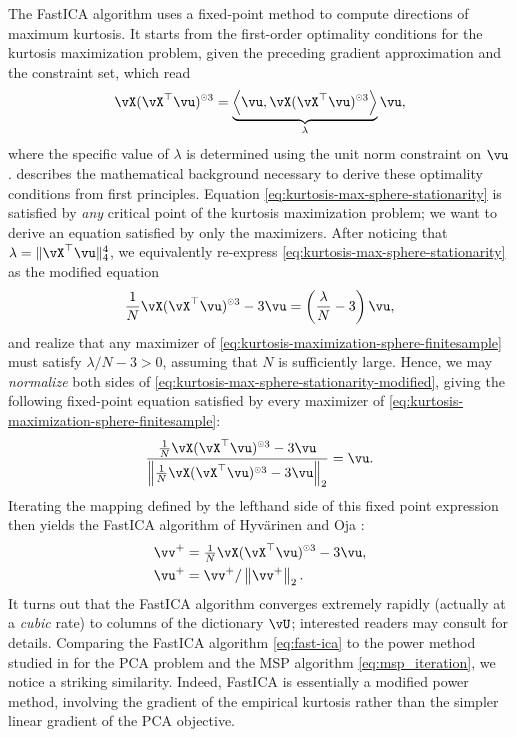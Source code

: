 \documentclass[../../book-main.tex]{subfiles}
\begin{document}
The FastICA algorithm uses a fixed-point method to compute directions of maximum kurtosis. It starts from the first-order optimality conditions for the kurtosis maximization problem, given the preceding gradient approximation and the constraint set, which read
\begin{align}\label{eq:kurtosis-max-sphere-stationarity}
   \vX (\vX^\top \vu)^{\hada 3} 
   = 
   \underbrace{
   \ip*{\vu}{
   \vX (\vX^\top \vu)^{\hada 3} 
   }}_{\lambda} \vu,
\end{align}
where the specific value of $\lambda$ is determined using the unit norm constraint on $\vu$.
 describes the mathematical background necessary to derive these optimality conditions from first principles.
Equation \eqref{eq:kurtosis-max-sphere-stationarity} is satisfied by \textit{any} critical point of the kurtosis maximization problem; we want to derive an equation satisfied by only the maximizers.
After noticing that $\lambda = \norm{\vX^\top \vu}_4^4$, we equivalently re-express \eqref{eq:kurtosis-max-sphere-stationarity} as the modified equation
\begin{align}\label{eq:kurtosis-max-sphere-stationarity-modified}
   \frac{1}{N}\vX (\vX^\top \vu)^{\hada 3} 
   - 
   3 \vu
   = 
   \left(
   \frac{\lambda}{N} - 3
   \right)
   \vu,
\end{align}
and realize that any maximizer of \eqref{eq:kurtosis-maximization-sphere-finitesample} 
must satisfy $\lambda / N - 3 > 0$,
assuming that $N$ is sufficiently large.
Hence, we may \textit{normalize} both sides of \eqref{eq:kurtosis-max-sphere-stationarity-modified},
giving the following fixed-point equation satisfied by every maximizer of \eqref{eq:kurtosis-maximization-sphere-finitesample}:
\begin{align}\label{eq:kurtosis-max-sphere-fxp}
\frac{
   \frac{1}{N}\vX (\vX^\top \vu)^{\hada 3} 
   - 
   3 \vu
   }{
   \norm*{
   \frac{1}{N}\vX (\vX^\top \vu)^{\hada 3} 
   - 
   3 \vu
   }_2
   }
   =
   \vu.
\end{align}
Iterating the mapping defined by the lefthand side of this fixed point expression then yields the FastICA algorithm of Hyv\"{a}rinen and Oja \cite{hyvarinen-1997}:
\begin{equation}
\begin{split}\label{eq:fast-ica}
   \vv^+ &= \tfrac{1}{N}\vX (\vX^\top \vu)^{\hada 3}- 3 \vu
   ,  \\
   \vu^+ &= \vv^+ / \norm*{\vv^+}_2.
   \end{split}
\end{equation}
It turns out that the FastICA algorithm converges extremely rapidly (actually at
a \textit{cubic} rate) to columns of the dictionary $\vU$; interested readers
may consult \cite{hyvarinen-1997} for details. 
Comparing the FastICA algorithm \eqref{eq:fast-ica} to the power method studied
in  for the PCA problem and the MSP algorithm
\eqref{eq:msp_iteration}, we notice a striking similarity. Indeed, FastICA is essentially a modified power method, involving the gradient of the empirical kurtosis rather than the simpler linear gradient of the PCA objective.
\end{document}
